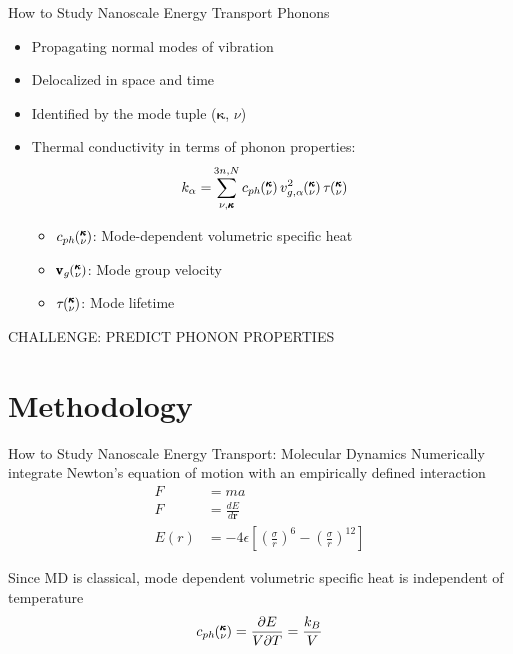 \documentclass{beamer}
\newcommand{\kv}{\mspace{-4.0mu}\left(\mspace{-8.0mu}
\begin{smallmatrix}&\pmb{\kappa} \\&\nu\end{smallmatrix}
\mspace{-3.0mu}\right)}
\begin{document}
\begin{frame}{How to Study Nanoscale Energy Transport}
Phonons
\begin{itemize}
\item Propagating normal modes of vibration
\item Delocalized in space and time
\item Identified by the mode tuple ($\pmb{\kappa}$, $\nu$)
\item Thermal conductivity in terms of phonon properties:
\begin{equation}\label{EQ:M:conductivity}
\begin{split}
k_{\mathbf{\alpha}}=&\sum_{\nu,\pmb{\kappa}}^{3n,N} c_{ph}\kv
v^{2}_{g,\mathbf{\alpha}}\kv \tau\kv
\end{split}
\end{equation}
\begin{itemize}
\item $c_{ph}\kv$: Mode-dependent volumetric specific heat
\item $\pmb{\mathrm{v}}_{g}\kv$: Mode group velocity
\item $\tau\kv$: Mode lifetime
\end{itemize}

\end{itemize}
CHALLENGE: PREDICT PHONON PROPERTIES
\end{frame}

\section{Methodology}
\begin{frame}{How to Study Nanoscale Energy Transport: Molecular Dynamics}
Numerically integrate Newton's equation of motion with an empirically defined interaction
\begin{equation}
\begin{split}
F&=ma\\
F&=\frac{dE}{d\pmb{r}}\\
E(r)&=-4\epsilon\left[\left(\frac{\sigma}{r}\right)^6-\left(\frac{\sigma}{r}\right)^{12}\right]
\end{split}
\end{equation}

Since MD is classical, mode dependent volumetric specific heat is independent of temperature
\begin{equation}\label{EQ:Cph}
c_{ph}\kv=\frac{\partial E}{V\partial T}=\frac{k_B}{V}	
\end{equation}
\end{frame}
\end{document}
